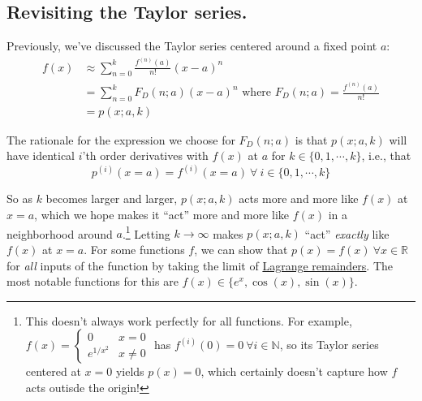 \documentclass[letterpaper,12pt]{report}
\begin{document}
\subsection{Revisiting the Taylor series.}

Previously, we've discussed the Taylor series centered around a fixed point \(a\):
\begin{equation}
\begin{split}
  f(x) &\approx \sum_{n=0}^{k}\frac{f^{(n)}(a)}{n!}(x-a)^n  \\
       &= \sum_{n=0}^{k}F_D(n; a) (x-a)^n \text{ where } F_D(n;a) = \frac{f^{(n)}(a)}{n!} \\
       &= p(x;a,k)
\end{split}
\end{equation}\label{equation:taylor-series}

The rationale for the expression we choose for \(F_D(n;a)\) 
is that \(p(x;a,k)\) will have identical \(i\)'th order derivatives with \(f(x)\) at \(a\)
for \(k \in \{0, 1, \cdots, k\}\), i.e., that
\[p^{(i)}(x=a) = f^{(i)}(x=a) \ \forall \ i \in \{0, 1, \cdots, k \}    \]

So as \(k\) becomes larger and larger, \(p(x;a,k)\) acts more and more like \(f(x)\)
at \(x=a\),
which we hope makes it ``act'' more and more like \(f(x)\)
in a neighborhood around \(a\).\footnote
{
  This doesn't always work perfectly for all functions. For example,
  \(f(x) = 
  \begin{cases}
    0 & x = 0 \\
    e^{1/x^2} & x \neq 0
  \end{cases}
  \)
  has \(f^{(i)}(0) = 0 \ \forall i \in \mathbb{N}\), 
  so its Taylor series centered at \(x=0\) yields \(p(x) = 0\),
  which certainly doesn't capture how \(f\) acts outisde the origin!
}
Letting \(k \rightarrow \infty\) makes \(p(x;a,k)\) ``act'' \emph{exactly}
like \(f(x)\) at \(x=a\).
For some functions \(f\), 
we can show that \(p(x) = f(x) \ \forall x\in \mathbb{R}\) for \emph{all} 
inputs of the function
by taking the limit of \href{https://math.stackexchange.com/a/2136695}{Lagrange remainders}.
The most notable functions for this are \(f(x) \in \{e^x,\cos(x),\sin(x)\}\).\par

\end{document}
